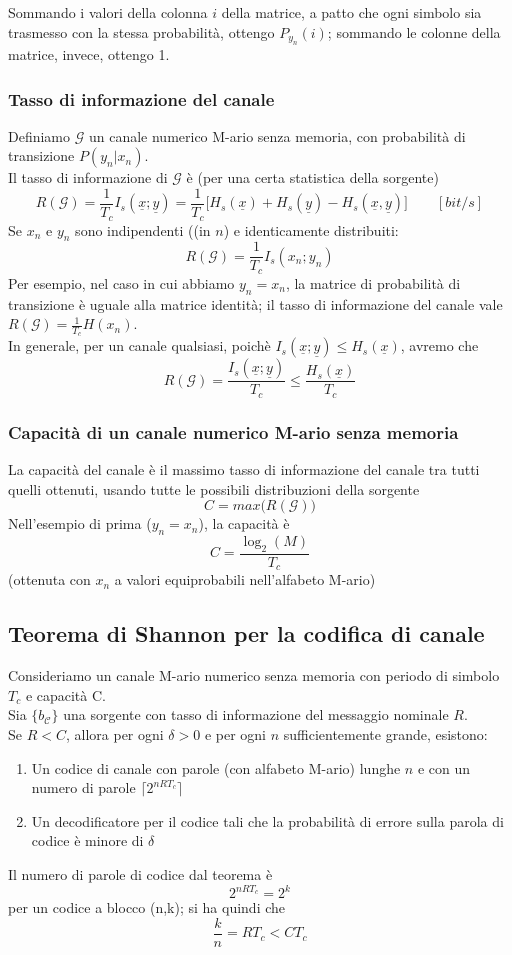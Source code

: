 \documentclass{article}
\begin{document}
Sommando i valori della colonna $i$ della matrice, a patto che ogni simbolo sia trasmesso con la stessa probabilità, ottengo $P_{y_n}(i)$; sommando le colonne della matrice, invece, ottengo 1.\\

\subsubsection{Tasso di informazione del canale}
Definiamo $\mathcal{G}$ un canale numerico M-ario senza memoria, con probabilità di transizione $P(y_n|x_n)$.\\
Il tasso di informazione di $\mathcal{G}$ è (per una certa statistica della sorgente) 
$$R(\mathcal{G})=\frac{1}{T_c}I_s(\underline{x};\underline{y})=\frac{1}{T_c}\big[H_s(\underline{x})+H_s(\underline{y})-H_s(\underline{x},\underline{y})\big]\qquad[bit/s]$$
Se $x_n$ e $y_n$ sono indipendenti ((in $n$) e identicamente distribuiti:
$$R(\mathcal{G})=\frac{1}{T_c}I_s(x_n;y_n)$$
Per esempio, nel caso in cui abbiamo $y_n=x_n$, la matrice di probabilità di transizione è uguale alla matrice identità; il tasso di informazione del canale vale $R(\mathcal{G})=\frac{1}{T_c}H(x_n)$.\\
In generale, per un canale qualsiasi, poichè $I_s(\underline{x};\underline{y})\leq H_s(\underline{x})$, avremo che $$R(\mathcal{G})=\frac{I_s(\underline{x};\underline{y})}{T_c}\leq\frac{H_s(\underline{x})}{T_c}$$

\subsubsection{Capacità di un canale numerico M-ario senza memoria}
La capacità del canale è il massimo tasso di informazione del canale tra tutti quelli ottenuti, usando tutte le possibili distribuzioni della sorgente $$C=max\big(R(\mathcal{G})\big)$$
Nell'esempio di prima ($y_n=x_n$), la capacità è $$C=\frac{\log_2(M)}{T_c}$$ (ottenuta con $x_n$ a valori equiprobabili nell'alfabeto M-ario)

\subsection{Teorema di Shannon per la codifica di canale}
Consideriamo un canale M-ario numerico senza memoria con periodo di simbolo $T_c$ e capacità C.\\
Sia $\{b_{\mathcal{C}}\}$ una sorgente con tasso di informazione del messaggio nominale $R$.\\
Se $R<C$, allora per ogni $\delta>0$ e per ogni $n$ sufficientemente grande, esistono:
\begin{enumerate}
	\item Un codice di canale con parole (con alfabeto M-ario) lunghe $n$ e con un numero di parole $\lceil2^{nRT_c}\rceil$
	\item Un decodificatore per il codice tali che la probabilità di errore sulla parola di codice è minore di $\delta$
\end{enumerate}
Il numero di parole di codice dal teorema è $$2^{nRT_c}=2^k$$ per un codice a blocco (n,k); si ha quindi che $$\frac{k}{n}=RT_c<CT_c$$
\end{document}
